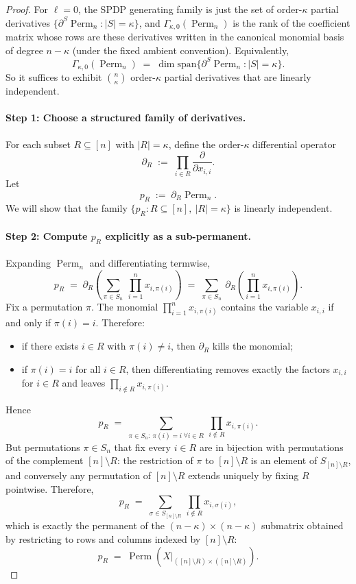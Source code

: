 \documentclass[12pt]{article}
\theoremstyle{definition}
\theoremstyle{remark}
\DeclareMathOperator{\Perm}{Perm}
\begin{document}
\begin{proof}
For $\ell=0$, the SPDP generating family is just the set of order-$\kappa$ partial
derivatives $\{\partial^S \Perm_n : |S|=\kappa\}$, and $\Gamma_{\kappa,0}(\Perm_n)$ is the
rank of the coefficient matrix whose rows are these derivatives written in the
canonical monomial basis of degree $n-\kappa$ (under the fixed ambient convention).
Equivalently,
\[
\Gamma_{\kappa,0}(\Perm_n) \;=\; \dim \mathrm{span}\{\partial^S \Perm_n : |S|=\kappa\}.
\]
So it suffices to exhibit $\binom{n}{\kappa}$ order-$\kappa$ partial derivatives that are
linearly independent.

\paragraph{Step 1: Choose a structured family of derivatives.}
For each subset $R\subseteq[n]$ with $|R|=\kappa$, define the order-$\kappa$ differential
operator
\[
\partial_R \;:=\; \prod_{i\in R} \frac{\partial}{\partial x_{i,i}}.
\]
Let
\[
p_R \;:=\; \partial_R \Perm_n.
\]
We will show that the family $\{p_R : R\subseteq[n],\ |R|=\kappa\}$ is linearly
independent.

\paragraph{Step 2: Compute $p_R$ explicitly as a sub-permanent.}
Expanding $\Perm_n$ and differentiating termwise,
\[
p_R
\;=\;
\partial_R \left(\sum_{\pi\in S_n}\ \prod_{i=1}^n x_{i,\pi(i)}\right)
\;=\;
\sum_{\pi\in S_n}\ \partial_R\left(\prod_{i=1}^n x_{i,\pi(i)}\right).
\]
Fix a permutation $\pi$. The monomial $\prod_{i=1}^n x_{i,\pi(i)}$ contains the
variable $x_{i,i}$ if and only if $\pi(i)=i$. Therefore:
\begin{itemize}
\item if there exists $i\in R$ with $\pi(i)\neq i$, then $\partial_R$ kills the monomial;
\item if $\pi(i)=i$ for all $i\in R$, then differentiating removes exactly the
factors $x_{i,i}$ for $i\in R$ and leaves $\prod_{i\notin R} x_{i,\pi(i)}$.
\end{itemize}
Hence
\[
p_R
\;=\;
\sum_{\pi\in S_n:\ \pi(i)=i\ \forall i\in R}\ \prod_{i\notin R} x_{i,\pi(i)}.
\]
But permutations $\pi\in S_n$ that fix every $i\in R$ are in bijection with
permutations of the complement $[n]\setminus R$: the restriction of $\pi$ to
$[n]\setminus R$ is an element of $S_{[n]\setminus R}$, and conversely any
permutation of $[n]\setminus R$ extends uniquely by fixing $R$ pointwise.
Therefore,
\[
p_R
\;=\;
\sum_{\sigma\in S_{[n]\setminus R}}\ \prod_{i\notin R} x_{i,\sigma(i)},
\]
which is exactly the permanent of the $(n-\kappa)\times(n-\kappa)$ submatrix obtained by
restricting to rows and columns indexed by $[n]\setminus R$:
\[
p_R \;=\; \Perm\!\left(X\big|_{([n]\setminus R)\times([n]\setminus R)}\right).
\]


\end{proof}
\end{document}
